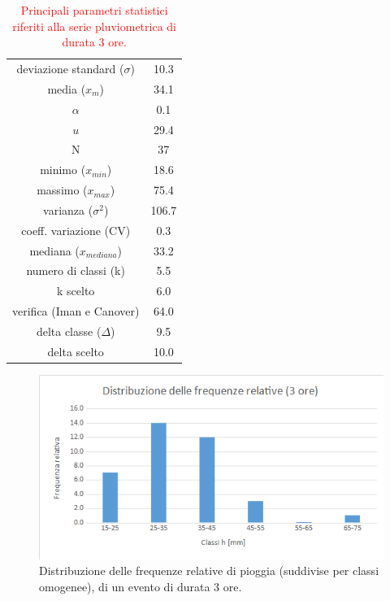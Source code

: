 \begin{table}[H] \centering
        \caption{\textcolor{red}{Principali parametri statistici riferiti alla serie pluviometrica di durata 3 ore.}}
     \begin{tabular}{cc}
        \toprule
    deviazione standard ($\sigma$) & 10.3 \\
    media ($x_m$)              & 34.1 \\
    $\alpha$            &  0.1 \\
    $u$           & 29.4\\
    N                & 37 \\
    minimo ($x_{min}$)      & 18.6 \\
    massimo ($x_{max}$)     & 75.4 \\
    varianza ($\sigma^2$)            & 106.7 \\
    coeff. variazione (CV)    &  0.3\\
    mediana ($x_{mediana}$)        & 33.2 \\
    numero di classi (k)      & 5.5  \\
    k scelto                 &  6.0 \\
    verifica (Iman e Canover) & 64.0 \\
    delta classe ($\Delta$)          & 9.5  \\
    delta scelto             & 10.0 \\
            \bottomrule
            \end{tabular}
    \end{table}

\begin{figure}[H]\centering
        \includegraphics[scale=.6]{immagini/freq_piogg_rel_3ore.png}
        \caption{Distribuzione delle frequenze relative di pioggia (suddivise per classi omogenee), di un evento di durata 3 ore.}
      \label{freq_rel_piogg_05ore}
\end{figure}
    
